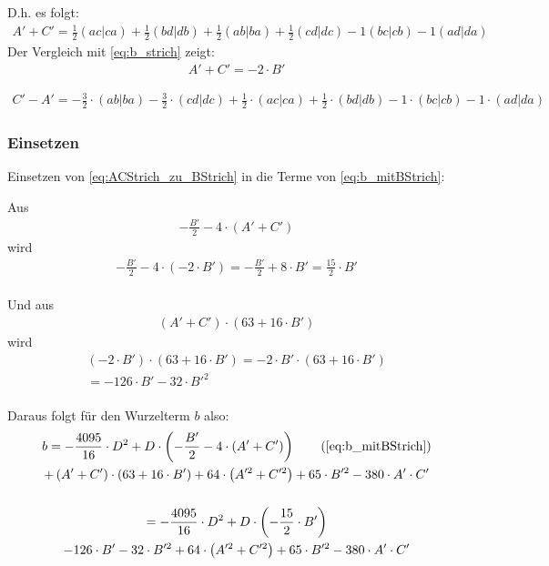 \documentclass[12pt,a4paper]{article}
\begin{document}
D.h. es folgt: 
\begin{gather}
A' + C' = 
\frac{1}{2} (ac|ca) + \frac{1}{2} (bd|db) + \frac{1}{2} (ab|ba) + \frac{1}{2} (cd|dc) 
- 1 (bc|cb) -1 (ad|da)
\end{gather}
Der Vergleich mit \eqref{eq:b_strich} zeigt: 
\begin{gather}
\label{eq:ACStrich_zu_BStrich}
A' + C' = -2 \cdot B'
\end{gather}

\begin{gather}
C' -  A'  =  
- \frac{3}{2} \cdot (ab|ba) 
- \frac{3}{2} \cdot(cd|dc)
+ \frac{1}{2} \cdot(ac|ca) 
+ \frac{1}{2} \cdot(bd|db) 
- 1\cdot (bc|cb) - 1 \cdot(ad|da)
\end{gather}
 

\subsubsection{Einsetzen}
Einsetzen von \eqref{eq:ACStrich_zu_BStrich} in die Terme von \eqref{eq:b_mitBStrich}: 

Aus 
\begin{gather}
- \frac{B'}{2} - 4\cdot \left(A' + C'\right) 
\end{gather} wird
\begin{gather}
- \frac{B'}{2} - 4\cdot \left(- 2 \cdot B'\right)  
= - \frac{B'}{2} + 8\cdot B' = \frac{15}{2} \cdot B'
\end{gather} \\


Und aus 
\begin{gather}
\left(A' + C'\right) \cdot \left( 63+ 16\cdot B'\right) 
\end{gather} wird 
\begin{gather}
\left(-2 \cdot B'\right) \cdot \left( 63+ 16\cdot B'\right) 
= -2 \cdot B'\cdot \left( 63+ 16\cdot B'\right) \\ 
= - 126 \cdot B' - 32 \cdot B'^2 
\end{gather} \\


Daraus folgt für den Wurzelterm $b$ also: 
\begin{gather}
b = -\frac{4095}{16} \cdot D^2 
+ D\cdot \left( 
- \frac{B'}{2} - 4\cdot \left(A' + C'\right) 
\right) 
\tag{\ref{eq:b_mitBStrich}}
\\ \notag
+  
\left(A' + C'\right) \cdot \left( 63+ 16\cdot B'\right) 
+ 64 \cdot  \left(A'^2 + C'^2\right)
+ 65 \cdot B'^2 
- 380 \cdot A' \cdot C'
\\ \notag \\ 
= -\frac{4095}{16} \cdot D^2 
+ D\cdot \left( 
- \frac{15}{2} \cdot B'  
\right) 
\\ \notag
- 126 \cdot B' - 32 \cdot B'^2
+ 64 \cdot  \left(A'^2 + C'^2\right)
+ 65 \cdot B'^2 
- 380 \cdot A' \cdot C'
\end{gather} 
\end{document}
